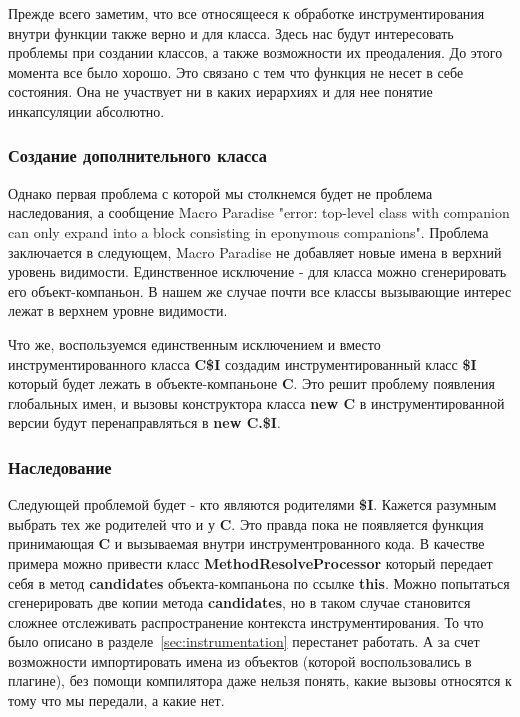 Прежде всего заметим, что все относящееся к обработке инструментирования внутри
функции также верно и для класса.
Здесь нас будут интересовать проблемы при создании классов, а также возможности
их преодаления.
До этого момента все было хорошо.
Это связано с тем что функция не несет в себе состояния.
Она не участвует ни в каких иерархиях и для нее понятие инкапсуляции абсолютно.

\subsubsection{Создание дополнительного класса}

Однако первая проблема с которой мы столкнемся будет не проблема наследования,
а сообщение Macro Paradise
"error: top-level class with companion can only expand into a block consisting
in eponymous companions".
Проблема заключается в следующем, Macro Paradise не добавляет новые имена в
верхний уровень видимости.
Единственное исключение - для класса можно сгенерировать его объект-компаньон.
В нашем же случае почти все классы вызывающие интерес лежат в верхнем уровне
видимости.

Что же, воспользуемся единственным исключением и вместо инструментированного
класса \textbf{C\$I} создадим инструментированный класс \textbf{\$I} который
будет лежать в объекте-компаньоне \textbf{C}.
Это решит проблему появления глобальных имен, и вызовы конструктора класса
\textbf{new C} в инструментированной версии будут перенаправляться
в \textbf{new C.\$I}.

\subsubsection{Наследование}

Следующей проблемой будет - кто являются родителями \textbf{\$I}.
Кажется разумным выбрать тех же родителей что и у \textbf{C}.
Это правда пока не появляется функция принимающая \textbf{C} и вызываемая
внутри инструментрованного кода.
В качестве примера можно привести класс \textbf{MethodResolveProcessor}
который передает себя в метод \textbf{candidates} объекта-компаньона
по ссылке \textbf{this}.
Можно попытаться сгенерировать две копии метода \textbf{candidates},
но в таком случае становится сложнее отслеживать распространение контекста
инструментирования.
То что было описано в разделе~\ref{sec:instrumentation} перестанет работать.
А за счет возможности импортировать имена из объектов (которой воспользовались
в плагине), без помощи компилятора даже нельзя понять, какие вызовы относятся
к тому что мы передали, а какие нет.

